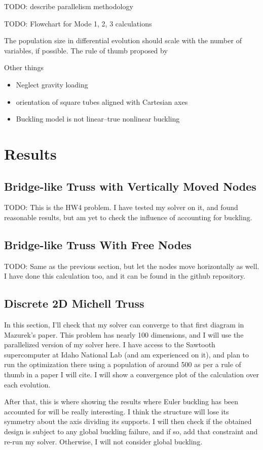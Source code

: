 \documentclass{article}
\begin{document}
TODO: describe parallelism methodology

TODO: Flowchart for Mode 1, 2, 3 calculations

The population size in differential evolution should scale with the number of
variables, if possible. The rule of thumb proposed by \cite{piotrowskiReviewDifferentialEvolution2017}

Other things
\begin{itemize}
  \item Neglect gravity loading
  \item orientation of square tubes aligned with Cartesian axes
  \item Buckling model is not linear--true nonlinear buckling
\end{itemize}

\section{Results}

\subsection{Bridge-like Truss with Vertically Moved Nodes}
TODO: This is the HW4 problem. I have tested my solver on it, and found
reasonable results, but am yet to check the influence of accounting
for buckling.

\subsection{Bridge-like Truss With Free Nodes}
TODO: Same as the previous section, but let the nodes move horizontally
as well. I have done this calculation too, and it can be found
in the github repository.

\subsection{Discrete 2D Michell Truss}
In this section, I'll check that my solver can converge to that
first diagram in Mazurek's paper. This problem has nearly 100 dimensions,
and I will use the parallelized version of my solver here. I have
access to the Sawtooth supercomputer at Idaho National Lab (and am experienced
on it), and plan to run the optimization there using a population of around
500 as per a rule of thumb in a paper I will cite. I will show a convergence plot of the calculation
over each evolution.

After that, this is where showing the results where Euler buckling
has been accounted for will be really interesting. I think the structure
will lose its symmetry about the axis dividing its supports. I will then
check if the obtained design is subject to any global buckling failure,
and if so, add that constraint and re-run my solver. Otherwise, I will not
consider global buckling.
\end{document}
